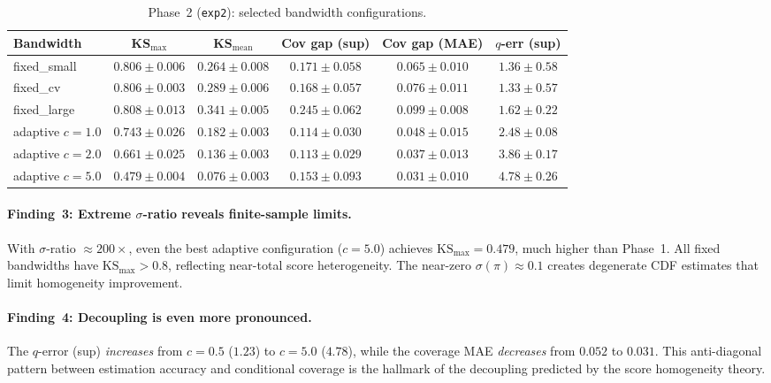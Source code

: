 \documentclass[11pt]{article}
\theoremstyle{remark}
\begin{document}
\begin{table}[h]
\centering
\small
\caption{Phase~2 (\texttt{exp2}): selected bandwidth configurations.}
\label{tab:exp2}
\begin{tabular}{@{}lccccc@{}}
\toprule
\textbf{Bandwidth} & \textbf{KS$_{\max}$} & \textbf{KS$_{\mathrm{mean}}$}
  & \textbf{Cov gap (sup)} & \textbf{Cov gap (MAE)} & \textbf{$q$-err (sup)} \\
\midrule
fixed\_small & $0.806 \pm 0.006$ & $0.264 \pm 0.008$ & $0.171 \pm 0.058$
  & $0.065 \pm 0.010$ & $1.36 \pm 0.58$ \\
fixed\_cv    & $0.806 \pm 0.003$ & $0.289 \pm 0.006$ & $0.168 \pm 0.057$
  & $0.076 \pm 0.011$ & $1.33 \pm 0.57$ \\
fixed\_large & $0.808 \pm 0.013$ & $0.341 \pm 0.005$ & $0.245 \pm 0.062$
  & $0.099 \pm 0.008$ & $1.62 \pm 0.22$ \\
\midrule
adaptive $c\!=\!1.0$ & $0.743 \pm 0.026$ & $0.182 \pm 0.003$ & $0.114 \pm 0.030$
  & $0.048 \pm 0.015$ & $2.48 \pm 0.08$ \\
adaptive $c\!=\!2.0$ & $0.661 \pm 0.025$ & $0.136 \pm 0.003$ & $0.113 \pm 0.029$
  & $0.037 \pm 0.013$ & $3.86 \pm 0.17$ \\
adaptive $c\!=\!5.0$ & $\mathbf{0.479 \pm 0.004}$ & $\mathbf{0.076 \pm 0.003}$
  & $0.153 \pm 0.093$ & $\mathbf{0.031 \pm 0.010}$ & $4.78 \pm 0.26$ \\
\bottomrule
\end{tabular}
\end{table}

\paragraph{Finding~3: Extreme $\sigma$-ratio reveals finite-sample limits.}
With $\sigma$-ratio $\approx 200\times$, even the best adaptive
configuration ($c = 5.0$) achieves $\mathrm{KS}_{\max} = 0.479$,
much higher than Phase~1. All fixed bandwidths have
$\mathrm{KS}_{\max} > 0.8$, reflecting near-total score heterogeneity.
The near-zero $\sigma(\pi) \approx 0.1$ creates degenerate CDF
estimates that limit homogeneity improvement.

\paragraph{Finding~4: Decoupling is even more pronounced.}
The $q$-error (sup) \emph{increases} from $c = 0.5$ ($1.23$) to
$c = 5.0$ ($4.78$), while the coverage MAE \emph{decreases} from
$0.052$ to $0.031$. This anti-diagonal pattern between estimation
accuracy and conditional coverage is the hallmark of the decoupling
predicted by the score homogeneity theory.
\end{document}
